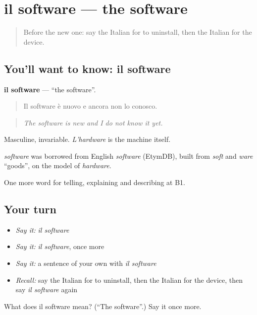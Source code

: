 \section[il software]{il software — the software}

\label{lesson:IT-C400-software}



\begin{quote}
Before the new one: say the Italian for to uninstall, then the Italian for the device.
\end{quote}

\subsection*{You'll want to know: il software}
\textbf{il software} — \textquotedblleft{}the software\textquotedblright{}.

\begin{quote}
Il software è nuovo e ancora non lo conosco.
\end{quote}

\begin{quote}
\emph{The software is new and I do not know it yet.}
\end{quote}

Masculine, invariable. \emph{L'hardware} is the machine itself.

\begin{cousinweb}
\emph{software} was borrowed from English \emph{software} (EtymDB), built from \emph{soft} and \emph{ware} \textquotedblleft{}goods\textquotedblright{}, on the model of \emph{hardware}.
\end{cousinweb}

\begin{grammarlens}[title={What you've built}]
One more word for telling, explaining and describing at B1.
\end{grammarlens}

\subsection*{Your turn}
\begin{itemize}
\raggedright
  \item \emph{Say it:} \emph{il software}
  \item \emph{Say it:} \emph{il software}, once more
  \item \emph{Say it:} a sentence of your own with \emph{il software}
  \item \emph{Recall:} say the Italian for to uninstall, then the Italian for the device, then say \emph{il software} again
\end{itemize}

\begin{tcolorbox}[breakable,colback=teal!4,colframe=teal!35!black,title={Before you move on}]
What does il software mean? (\textquotedblleft{}The software\textquotedblright{}.) Say it once more.
\end{tcolorbox}
